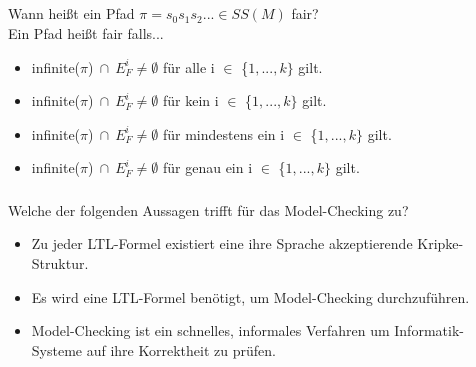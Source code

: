 \documentclass[a4paper,12pt]{scrartcl}
\begin{document}
\subsection{}
Wann heißt ein Pfad $\pi=s_0s_1s_2... \in SS(M)$ fair?\\
Ein Pfad heißt fair falls...
\begin{itemize}
\item infinite($\pi$)$\ \cap\ E^i_F \neq \emptyset$ für alle i $\in$ \{$1, ..., k\}$ gilt.
\item infinite($\pi$)$\ \cap\ E^i_F \neq \emptyset$ für kein i $\in$ \{$1, ..., k\}$ gilt.
\item infinite($\pi$)$\ \cap\ E^i_F \neq \emptyset$ für mindestens ein i $\in$ \{$1, ..., k\}$ gilt.
\item infinite($\pi$)$\ \cap\ E^i_F \neq \emptyset$ für genau ein i $\in$ \{$1, ..., k\}$ gilt.
\end{itemize}

\subsubsection*{}
Welche der folgenden Aussagen trifft für das Model-Checking zu?
\begin{itemize}
\item Zu jeder LTL-Formel existiert eine ihre Sprache akzeptierende Kripke-Struktur.
\item Es wird eine LTL-Formel benötigt, um Model-Checking durchzuführen.
\item Model-Checking ist ein schnelles, informales Verfahren um Informatik-Systeme auf ihre Korrektheit zu prüfen.
\end{itemize}
\end{document}
